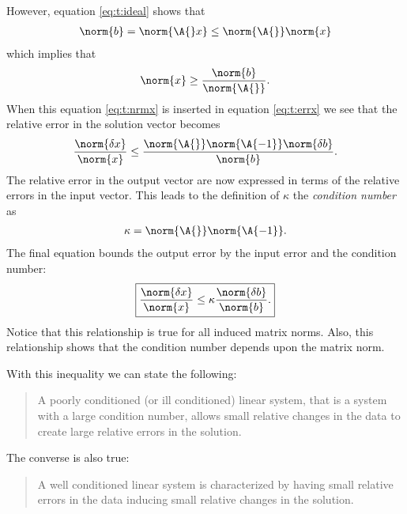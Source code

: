 However, equation \eqref{eq:t:ideal} shows that
\begin{equation}
  \begin{split}
    \norm{b} = \norm{\A{}x} \le \norm{\A{}}\norm{x}
  \end{split}
\end{equation}
which implies that
\begin{equation}
  \begin{split}
    \norm{x} \ge \frac{\norm{b}}{\norm{\A{}}}.
  \end{split}
  \label{eq:t:nrmx}
\end{equation}
When this equation \eqref{eq:t:nrmx} is inserted in equation \eqref{eq:t:errx} we see that the relative error in the solution vector becomes
\begin{equation}
  \begin{split}
    \frac{ \norm{\delta x}}{\norm{x}} \le \frac{\norm{\A{}}\norm{\A{-1}}\norm{\delta b}}{\norm{b}}.
  \end{split}
\end{equation}
The relative error in the output vector are now expressed in terms of the relative errors in the input vector. This leads to the definition of $\kappa$ the \textit{condition number} as
\begin{equation}
  \begin{split}
    \kappa = \norm{\A{}}\norm{\A{-1}}.
  \end{split}
\end{equation}
The final equation bounds the output error by the input error and the condition number:
\begin{equation}
\boxed{
\frac{ \norm{\delta x}}{\norm{x}} \le \kappa \frac{\norm{\delta b}}{\norm{b}}.
}
\end{equation}
Notice that this relationship is true for all induced matrix norms. Also, this relationship shows that the condition number depends upon the matrix norm.

With this inequality we can state the following:
\begin{quotation}
  A poorly conditioned (or ill conditioned) linear system, that is a system with a large condition number, allows small relative changes in the data to create large relative errors in the solution.
\end{quotation}
The converse is also true:
\begin{quotation}
  A well conditioned linear system is characterized by having small relative errors in the data inducing small relative changes in the solution.
\end{quotation}


